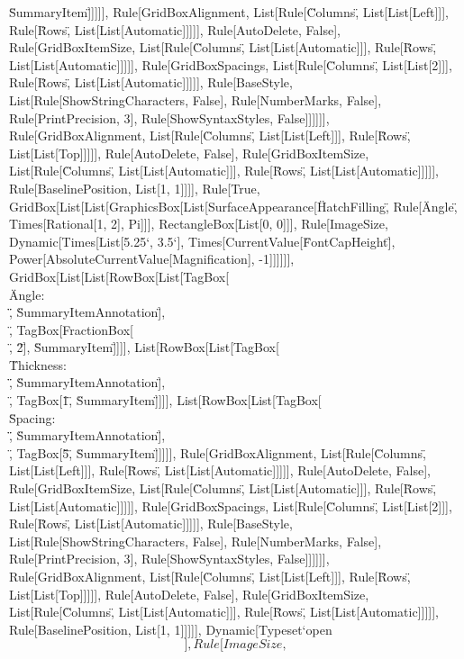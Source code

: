 \documentclass{article}
\begin{document}
{{{{\"SummaryItem\"]]]]], Rule[GridBoxAlignment, List[Rule[\"Columns\", List[List[Left]]], Rule[\"Rows\", List[List[Automatic]]]]], Rule[AutoDelete,
False], Rule[GridBoxItemSize, List[Rule[\"Columns\", List[List[Automatic]]], Rule[\"Rows\", List[List[Automatic]]]]], Rule[GridBoxSpacings, List[Rule[\"Columns\",
List[List[2]]], Rule[\"Rows\", List[List[Automatic]]]]], Rule[BaseStyle, List[Rule[ShowStringCharacters, False], Rule[NumberMarks, False], Rule[PrintPrecision,
3], Rule[ShowSyntaxStyles, False]]]]]], Rule[GridBoxAlignment, List[Rule[\"Columns\", List[List[Left]]], Rule[\"Rows\", List[List[Top]]]]], Rule[AutoDelete,
False], Rule[GridBoxItemSize, List[Rule[\"Columns\", List[List[Automatic]]], Rule[\"Rows\", List[List[Automatic]]]]], Rule[BaselinePosition, List[1,
1]]]], Rule[True, GridBox[List[List[GraphicsBox[List[SurfaceAppearance[\"HatchFilling\", Rule[\"Angle\", Times[Rational[1, 2], Pi]]], RectangleBox[List[0,
0]]], Rule[ImageSize, Dynamic[Times[List[5.25`, 3.5`], Times[CurrentValue[\"FontCapHeight\"], Power[AbsoluteCurrentValue[Magnification], -1]]]]]],
GridBox[List[List[RowBox[List[TagBox[\"\\\"Angle: \\\"\", \"SummaryItemAnnotation\"], \"\\[InvisibleSpace]\", TagBox[FractionBox[\"\\[Pi]\", \"2\"],
\"SummaryItem\"]]]], List[RowBox[List[TagBox[\"\\\"Thickness: \\\"\", \"SummaryItemAnnotation\"], \"\\[InvisibleSpace]\", TagBox[\"1\", \"SummaryItem\"]]]],
List[RowBox[List[TagBox[\"\\\"Spacing: \\\"\", \"SummaryItemAnnotation\"], \"\\[InvisibleSpace]\", TagBox[\"5\", \"SummaryItem\"]]]]], Rule[GridBoxAlignment,
List[Rule[\"Columns\", List[List[Left]]], Rule[\"Rows\", List[List[Automatic]]]]], Rule[AutoDelete, False], Rule[GridBoxItemSize, List[Rule[\"Columns\",
List[List[Automatic]]], Rule[\"Rows\", List[List[Automatic]]]]], Rule[GridBoxSpacings, List[Rule[\"Columns\", List[List[2]]], Rule[\"Rows\", List[List[Automatic]]]]],
Rule[BaseStyle, List[Rule[ShowStringCharacters, False], Rule[NumberMarks, False], Rule[PrintPrecision, 3], Rule[ShowSyntaxStyles, False]]]]]], Rule[GridBoxAlignment,
List[Rule[\"Columns\", List[List[Left]]], Rule[\"Rows\", List[List[Top]]]]], Rule[AutoDelete, False], Rule[GridBoxItemSize, List[Rule[\"Columns\",
List[List[Automatic]]], Rule[\"Rows\", List[List[Automatic]]]]], Rule[BaselinePosition, List[1, 1]]]]], Dynamic[Typeset`open$$], Rule[ImageSize,
$$}}}}
\end{document}
